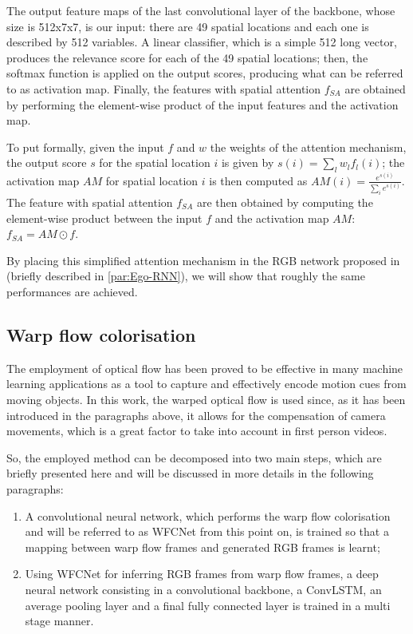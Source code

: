 \documentclass[10pt,twocolumn,letterpaper]{article}
\begin{document}
The output feature maps of the last convolutional layer of the backbone, whose size is 512x7x7, is our input: there are 49 spatial locations and each one is described by 512 variables. A linear classifier, which is a simple 512 long vector, produces the relevance score for each of the 49 spatial locations; then, the softmax function is applied on the output scores, producing what can be referred to as activation map. Finally, the features with spatial attention $f_{SA}$ are obtained by performing the element-wise product of the input features and the activation map.

To put formally, given the input $f$ and $w$ the weights of the attention mechanism, the output score $s$ for the spatial location $i$ is given by $s(i) = \sum_l w_l f_l(i)$; the activation map $AM$ for spatial location $i$ is then computed as $AM(i) = \frac{e^{s(i)}}{\sum_i e^{s(i)}}$. The feature with spatial attention $f_{SA}$ are then obtained by computing the element-wise product between the input $f$ and the activation map $AM$: $f_{SA} = AM \odot f$.

By placing this simplified attention mechanism in the RGB network proposed in \cite{Ego-RNN} (briefly described in \ref{par:Ego-RNN}), we will show that roughly the same performances are achieved.

\subsection{Warp flow colorisation}

The employment of optical flow has been proved to be effective in many machine learning applications as a tool to capture and effectively encode motion cues from moving objects. In this work, the warped optical flow is used since, as it has been introduced in the paragraphs above, it allows for the compensation of camera movements, which is a great factor to take into account in first person videos.

So, the employed method can be decomposed into two main steps, which are briefly presented here and will be discussed in more details in the following paragraphs:
\begin{enumerate}
	\item A convolutional neural network, which performs the warp flow colorisation and will be referred to as WFCNet from this point on, is trained so that a mapping between warp flow frames and generated RGB frames is learnt; 
	\item Using WFCNet for inferring RGB frames from warp flow frames, a deep neural network consisting in a convolutional backbone, a ConvLSTM, an average pooling layer and a final fully connected layer is trained in a multi stage manner.
\end{enumerate}
\end{document}
